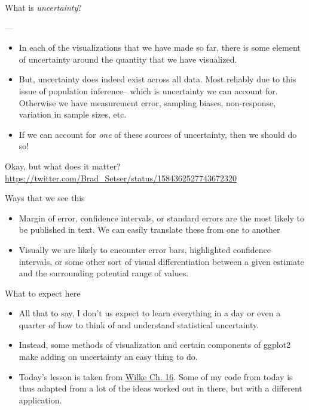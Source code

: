 \documentclass[
  ignorenonframetext,
]{beamer}
\begin{document}
\begin{frame}{What is \emph{uncertainty}?}
\protect\hypertarget{what-is-uncertainty}{}
\end{frame}

\begin{frame}{---}
\protect\hypertarget{section}{}
\begin{itemize}
\item
  In each of the visualizations that we have made so far, there is some
  element of uncertainty around the quantity that we have visualized.
\item
  But, uncertainty does indeed exist across all data. Most reliably due
  to this issue of population inference-- which is uncertainty we can
  account for. Otherwise we have measurement error, sampling biases,
  non-response, variation in sample sizes, etc.
\item
  If we can account for \emph{one} of these sources of uncertainty, then
  we should do so!
\end{itemize}
\end{frame}

\begin{frame}{Okay, but what does it matter?}
\protect\hypertarget{okay-but-what-does-it-matter}{}
\url{https://twitter.com/Brad_Setser/status/1584362527743672320}
\end{frame}

\begin{frame}{Ways that we see this}
\protect\hypertarget{ways-that-we-see-this}{}
\begin{itemize}
\item
  Margin of error, confidence intervals, or standard errors are the most
  likely to be published in text. We can easily translate these from one
  to another
\item
  Visually we are likely to encounter error bars, highlighted confidence
  intervals, or some other sort of visual differentiation between a
  given estimate and the surrounding potential range of values.
\end{itemize}
\end{frame}

\begin{frame}{What to expect here}
\protect\hypertarget{what-to-expect-here}{}
\begin{itemize}
\item
  All that to say, I don't us expect to learn everything in a day or
  even a quarter of how to think of and understand statistical
  uncertainty.
\item
  Instead, some methods of visualization and certain components of
  ggplot2 make adding on uncertainty an easy thing to do.
\item
  Today's lesson is taken from
  \href{https://clauswilke.com/dataviz/visualizing-uncertainty.html}{Wilke
  Ch. 16}. Some of my code from today is thus adapted from a lot of the
  ideas worked out in there, but with a different application.
\end{itemize}
\end{frame}
\end{document}
